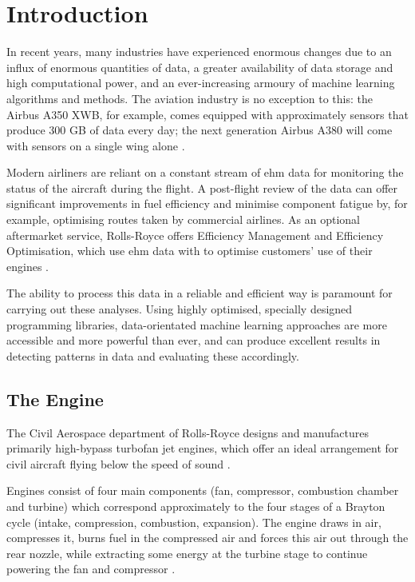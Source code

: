 \section{Introduction}
In recent years, many industries have experienced enormous changes due to an influx of enormous quantities of data, a greater availability of data storage and high computational power, and an ever-increasing armoury of machine learning algorithms and methods. The aviation industry is no exception to this: the Airbus A350 XWB, for example, comes equipped with approximately  sensors that produce 300 GB of data every day; the next generation Airbus A380 will come with  sensors on a single wing alone \cite[]{rajaraman_big_2016}.

Modern airliners are reliant on a constant stream of \ac{ehm} data for monitoring the status of the aircraft during the flight. A post-flight review of the data can offer significant improvements in fuel efficiency and minimise component fatigue by, for example, optimising routes taken by commercial airlines. As an optional aftermarket service, Rolls-Royce offers Efficiency Management and Efficiency Optimisation, which use \ac{ehm} data with  to optimise customers' use of their engines \cite[]{rolls-royce_plc_airlines_2020}.

The ability to process this data in a reliable and efficient way is paramount for carrying out these analyses. Using highly optimised, specially designed programming libraries, data-orientated machine learning approaches are more accessible and more powerful than ever, and can produce excellent results in detecting patterns in data and evaluating these accordingly.

\subsection{The Engine}
The Civil Aerospace department of Rolls-Royce designs and manufactures primarily high-bypass turbofan jet engines, which offer an ideal arrangement for civil aircraft flying below the speed of sound \cite[]{rolls-royce_plc_jet_2015}.

Engines consist of four main components (fan, compressor, combustion chamber and turbine) which correspond approximately to the four stages of a Brayton cycle (intake, compression, combustion, expansion). The engine draws in air, compresses it, burns fuel in the compressed air and forces this air out through the rear nozzle, while extracting some energy at the turbine stage to continue powering the fan and compressor \cite[]{rolls-royce_plc_jet_2015}.


